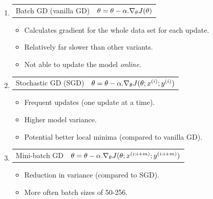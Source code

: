 \documentclass{beamer}
\begin{document}
\begin{frame}
    \begin{enumerate}
        \item 
        \begin{tabular}{c c}
             Batch GD (vanilla GD) &  $\mathnormal{\theta = \theta - \alpha . \nabla_\theta {J}(\theta)}$
        \end{tabular}
            \begin{itemize}
                \color{magenta}
                \item Calculates gradient for the whole data set for each update.
                \item Relatively far slower than other variants.
                \item Not able to update the model \textit{online}.
            \end{itemize}
        \item 
        \begin{tabular}{c c}
            Stochastic GD (SGD) &  $\mathnormal{\theta = \theta - \alpha . \nabla_{\theta} J(\theta; x^{(i)}; y^{(i)}) }$
        \end{tabular}
            \begin{itemize}
                \color{magenta}
                \item Frequent updates (one update at a time).
                \item Higher model variance.
                \item Potential better local minima (compared to vanilla GD).
            \end{itemize}
        \item 
        \begin{tabular}{c c}
            Mini-batch GD &  $\mathnormal{\theta = \theta - \alpha . \nabla_{\theta} J(\theta; x^{(i:i+m)}; y^{(i:i+m)})}$
        \end{tabular}
            \begin{itemize}
                \color{magenta}
                \item Reduction in variance (compared to SGD).
                \item More often batch sizes of 50-256.
            \end{itemize}
    \end{enumerate}

\end{frame}
\end{document}
